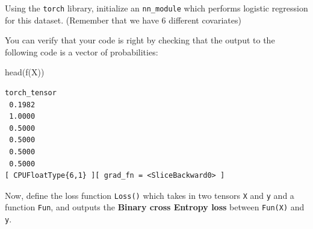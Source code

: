 \documentclass[
  letterpaper,
  DIV=11,
  numbers=noendperiod]{scrartcl}
\newenvironment{Shaded}{\begin{snugshade}}{\end{snugshade}}
\newcommand{\AttributeTok}[1]{\textcolor[rgb]{0.40,0.45,0.13}{#1}}
\newcommand{\CommentTok}[1]{\textcolor[rgb]{0.37,0.37,0.37}{#1}}
\newcommand{\ControlFlowTok}[1]{\textcolor[rgb]{0.00,0.23,0.31}{#1}}
\newcommand{\DecValTok}[1]{\textcolor[rgb]{0.68,0.00,0.00}{#1}}
\newcommand{\FloatTok}[1]{\textcolor[rgb]{0.68,0.00,0.00}{#1}}
\newcommand{\FunctionTok}[1]{\textcolor[rgb]{0.28,0.35,0.67}{#1}}
\newcommand{\NormalTok}[1]{\textcolor[rgb]{0.00,0.23,0.31}{#1}}
\newcommand{\OtherTok}[1]{\textcolor[rgb]{0.00,0.23,0.31}{#1}}
\newcommand{\SpecialCharTok}[1]{\textcolor[rgb]{0.37,0.37,0.37}{#1}}
\begin{document}
Using the \texttt{torch} library, initialize an \texttt{nn\_module}
which performs logistic regression for this dataset. (Remember that we
have 6 different covariates)

\begin{Shaded}
\end{Shaded}

You can verify that your code is right by checking that the output to
the following code is a vector of probabilities:

\begin{Shaded}
\begin{Highlighting}[]
\FunctionTok{head}\NormalTok{(}\FunctionTok{f}\NormalTok{(X))}
\end{Highlighting}
\end{Shaded}

\begin{verbatim}
torch_tensor
 0.1982
 1.0000
 0.5000
 0.5000
 0.5000
 0.5000
[ CPUFloatType{6,1} ][ grad_fn = <SliceBackward0> ]
\end{verbatim}

Now, define the loss function \texttt{Loss()} which takes in two tensors
\texttt{X} and \texttt{y} and a function \texttt{Fun}, and outputs the
\textbf{Binary cross Entropy loss} between \texttt{Fun(X)} and
\texttt{y}.
\end{document}
